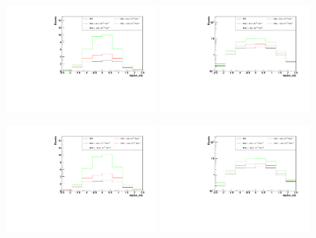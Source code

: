 \begin{figure}[h]
  \begin{center}
	\includegraphics[width=0.45\textwidth]{Plots/aQGC_kinematics/lepton_eta_FM6.pdf}%
	\includegraphics[width=0.45\textwidth]{Plots/aQGC_kinematics/lepton_eta_FM6_log.pdf}\\				
    \caption{}
  \end{center}
\end{figure}

\begin{figure}[h]
  \begin{center}
	\includegraphics[width=0.45\textwidth]{Plots/aQGC_kinematics/lepton_eta_FM7.pdf}%
	\includegraphics[width=0.45\textwidth]{Plots/aQGC_kinematics/lepton_eta_FM7_log.pdf}\\				
    \caption{}
  \end{center}
\end{figure}

